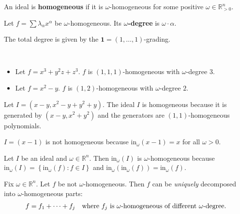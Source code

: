 \documentclass[a4paper, 11pt]{article}
\begin{document}
\begin{defi}
  An ideal is \textbf{homogeneous} if it is \( \omega \)-homogeneous for some positive \( \omega \in \mathbb R^n_{> 0} \).
\end{defi}

\begin{defi}
  Let \( f = \sum \lambda_\alpha x^\alpha \) be \( \omega \)-homogeneous. Its \textbf{\( \omega \)-degree} is \( \omega \cdot \alpha \).
\end{defi}

\begin{eg}
The total degree is given by the \( \mathbf 1 = (1, \dots, 1) \)-grading.
\end{eg}

\begin{eg}\(  \)
  \begin{itemize}
    \item   Let \( f = x^3 + y^2z + z^3 \). \( f \) is \( (1,1,1) \)-homogeneous with \( \omega \)-degree \( 3 \).
    \item Let \( f = x^2 - y \). \( f \) is \( (1,2) \)-homogeneous with \( \omega \)-degree \( 2 \).
  \end{itemize}
\end{eg}

\begin{eg}
  Let \( I = (x-y, x^2 - y + y^2  + y) \). The ideal \( I \) is homogeneous because it is generated by \( (x-y, x^2 + y^2) \) and the generators are \( (1,1) \)-homogeneous polynomials.
\end{eg}

\begin{eg}
  \( I = (x-1) \) is not homogeneous because \( \mathrm{in}_\omega(x-1) = x \) for all \( \omega > 0 \).
\end{eg}

\begin{remark}
  Let \( I \) be an ideal and \( \omega \in \mathbb R^n \). Then \( \mathrm{in}_\omega(I) \) is \( \omega \)-homogeneous because \( \mathrm{in}_\omega(I) = \left\{  \mathrm{in}_\omega(f) : f \in I \right\} \) and \( \mathrm{in}_\omega(\mathrm{in}_\omega(f)) = \mathrm{in}_\omega(f) \).
\end{remark}


\begin{remark}
  Fix \( \omega \in \mathbb R^n \). Let \( f \) be not \( \omega \)-homogeneous. Then \( f \) can be \emph{uniquely} decomposed into \( \omega \)-homogeneous parts: 
  \begin{align*}
    f = f_1 + \dots + f_j \quad \text{where \( f_j \) is \( \omega \)-homogeneous of different \( \omega \)-degree}.
  \end{align*}
\end{remark}
\end{document}
